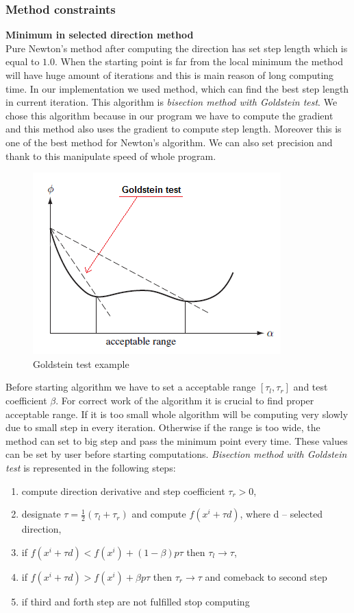 \documentclass[12pt]{article}
\begin{document}
\subsubsection{Method constraints} \label{MC}
\textbf{Minimum in selected direction method} \\
Pure Newton's method after computing the direction has set step length which is equal to $1.0$. When the starting point is far from the local minimum the method will have huge amount of iterations and this is main reason of long computing time. In our implementation we used method, which can find the best step length in current iteration. This algorithm is \textit{bisection method with Goldstein test}. We chose this algorithm because in our program we have to compute the gradient and this method also uses the gradient to compute step length. Moreover this is one of the best method for Newton's algorithm. We can also set precision and thank to this manipulate speed of whole program.
\begin{figure}[H]
\begin{center}
\includegraphics[scale=0.9]{images/goldstein.png}
\caption{Goldstein test example \cite{mathematics}}
\label{goldstein}
\end{center}		
\end{figure}
Before starting algorithm we have to set a acceptable range $[\tau_l, \tau_r]$ and test coefficient $\beta$. For correct work of the algorithm it is crucial to find proper acceptable range. If it is too small whole algorithm will be computing very slowly due to small step in every iteration. Otherwise if the range is too wide, the method can set to big step and pass the minimum point every time. These values can be set by user before starting computations. \textit{Bisection method with Goldstein test} is represented in the following steps:
\begin{enumerate}
\item compute direction derivative and step coefficient $\tau_r > 0$,
\item designate $\tau=\frac{1}{2}(\tau_l+\tau_r)$ and compute $f(x^i+\tau d)$, where d -- selected direction,
\item if $f(x^i+\tau d)<f(x^i)+(1-\beta)p\tau$ then $\tau_l \rightarrow \tau$,
\item if $f(x^i+\tau d)>f(x^i)+\beta p\tau$ then $\tau_r \rightarrow \tau$ and comeback to second step
\item if third and forth step are not fulfilled stop computing
\end{enumerate}
\end{document}

